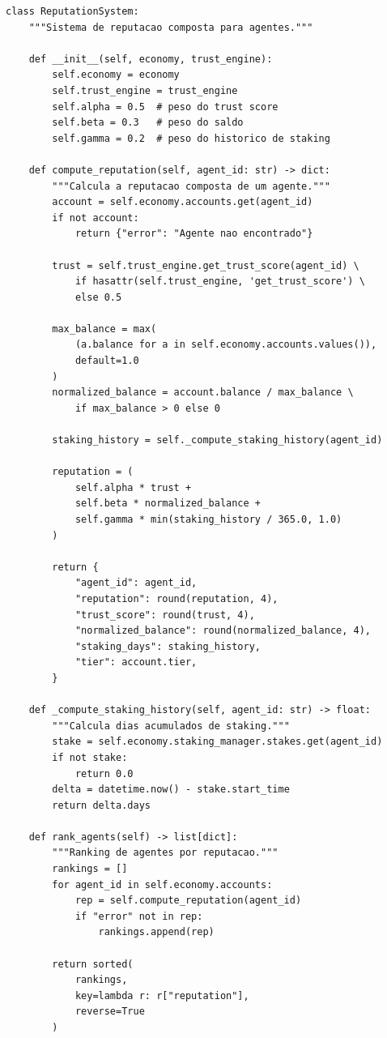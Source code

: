 \begin{lstlisting}[caption={Sistema de reputacao composta},
                  label={lst:reputacao}]
class ReputationSystem:
    """Sistema de reputacao composta para agentes."""

    def __init__(self, economy, trust_engine):
        self.economy = economy
        self.trust_engine = trust_engine
        self.alpha = 0.5  # peso do trust score
        self.beta = 0.3   # peso do saldo
        self.gamma = 0.2  # peso do historico de staking

    def compute_reputation(self, agent_id: str) -> dict:
        """Calcula a reputacao composta de um agente."""
        account = self.economy.accounts.get(agent_id)
        if not account:
            return {"error": "Agente nao encontrado"}

        trust = self.trust_engine.get_trust_score(agent_id) \
            if hasattr(self.trust_engine, 'get_trust_score') \
            else 0.5

        max_balance = max(
            (a.balance for a in self.economy.accounts.values()),
            default=1.0
        )
        normalized_balance = account.balance / max_balance \
            if max_balance > 0 else 0

        staking_history = self._compute_staking_history(agent_id)

        reputation = (
            self.alpha * trust +
            self.beta * normalized_balance +
            self.gamma * min(staking_history / 365.0, 1.0)
        )

        return {
            "agent_id": agent_id,
            "reputation": round(reputation, 4),
            "trust_score": round(trust, 4),
            "normalized_balance": round(normalized_balance, 4),
            "staking_days": staking_history,
            "tier": account.tier,
        }

    def _compute_staking_history(self, agent_id: str) -> float:
        """Calcula dias acumulados de staking."""
        stake = self.economy.staking_manager.stakes.get(agent_id)
        if not stake:
            return 0.0
        delta = datetime.now() - stake.start_time
        return delta.days

    def rank_agents(self) -> list[dict]:
        """Ranking de agentes por reputacao."""
        rankings = []
        for agent_id in self.economy.accounts:
            rep = self.compute_reputation(agent_id)
            if "error" not in rep:
                rankings.append(rep)

        return sorted(
            rankings,
            key=lambda r: r["reputation"],
            reverse=True
        )
\end{lstlisting}

